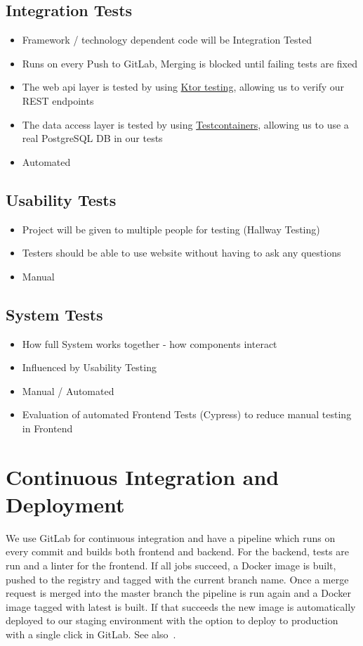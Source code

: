\subsection{Integration Tests}
\begin{itemize}
    \item Framework / technology dependent code will be Integration Tested
    \item Runs on every Push to GitLab, Merging is blocked until failing tests are fixed
    \item The web api layer is tested by using \hyperlink{https://ktor.io/docs/testing.html}{Ktor testing}, allowing us to verify our REST endpoints
    \item The data access layer is tested by using \hyperlink{https://www.testcontainers.org/}{Testcontainers}, allowing us to use a real PostgreSQL DB in our tests
    \item Automated
\end{itemize}

\subsection{Usability Tests}
\begin{itemize}
    \item Project will be given to multiple people for testing (Hallway Testing)
    \item Testers should be able to use website without having to ask any questions
    \item Manual
\end{itemize}

\subsection{System Tests}
\begin{itemize}
    \item How full System works together - how components interact
    \item Influenced by Usability Testing
    \item Manual / Automated
    \item Evaluation of automated Frontend Tests (Cypress) to reduce manual testing in Frontend
\end{itemize}

\section{Continuous Integration and Deployment}
We use GitLab for continuous integration and have a pipeline which runs on every commit and builds both frontend and backend.
For the backend, tests are run and a linter for the frontend.
If all jobs succeed, a Docker image is built, pushed to the registry and tagged with the current branch name.
Once a merge request is merged into the master branch the pipeline is run again and a Docker image tagged with latest is built.
If that succeeds the new image is automatically deployed to our staging environment with the option to deploy to production with a single click in GitLab.
See also~.

